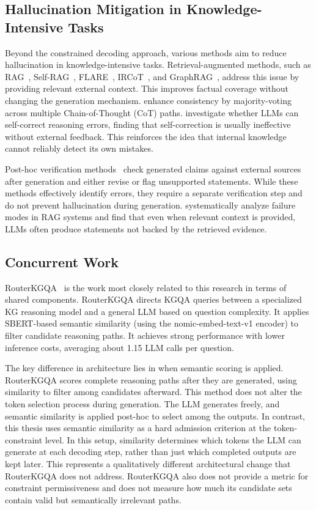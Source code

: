 \subsection{Hallucination Mitigation in Knowledge-Intensive Tasks}

Beyond the constrained decoding approach, various methods aim to reduce hallucination in knowledge-intensive tasks. Retrieval-augmented methods, such as RAG~\citep{lewis2020rag}, Self-RAG~\citep{asai2024selfrag}, FLARE~\citep{jiang2023flare}, IRCoT~\citep{trivedi2022ircot}, and GraphRAG~\citep{edge2024graphrag}, address this issue by providing relevant external context. This improves factual coverage without changing the generation mechanism. \citet{wang2023selfconsistency} enhance consistency by majority-voting across multiple Chain-of-Thought (CoT) paths. \citet{huang2024selfcorrect} investigate whether LLMs can self-correct reasoning errors, finding that self-correction is usually ineffective without external feedback. This reinforces the idea that internal knowledge cannot reliably detect its own mistakes.

Post-hoc verification methods~\citep{nakano2021webgpt, gao2023rarr} check generated claims against external sources after generation and either revise or flag unsupported statements. While these methods effectively identify errors, they require a separate verification step and do not prevent hallucination during generation. \citet{agrawal2024mindfulrag} systematically analyze failure modes in RAG systems and find that even when relevant context is provided, LLMs often produce statements not backed by the retrieved evidence.

\subsection{Concurrent Work}

RouterKGQA~\citep{yuan2026routerkgqa} is the work most closely related to this research in terms of shared components. RouterKGQA directs KGQA queries between a specialized KG reasoning model and a general LLM based on question complexity. It applies SBERT-based semantic similarity (using the nomic-embed-text-v1 encoder) to filter candidate reasoning paths. It achieves strong performance with lower inference costs, averaging about 1.15 LLM calls per question.

The key difference in architecture lies in when semantic scoring is applied. RouterKGQA scores complete reasoning paths after they are generated, using similarity to filter among candidates afterward. This method does not alter the token selection process during generation. The LLM generates freely, and semantic similarity is applied post-hoc to select among the outputs. In contrast, this thesis uses semantic similarity as a hard admission criterion at the token-constraint level. In this setup, similarity determines which tokens the LLM can generate at each decoding step, rather than just which completed outputs are kept later. This represents a qualitatively different architectural change that RouterKGQA does not address. RouterKGQA also does not provide a metric for constraint permissiveness and does not measure how much its candidate sets contain valid but semantically irrelevant paths.

